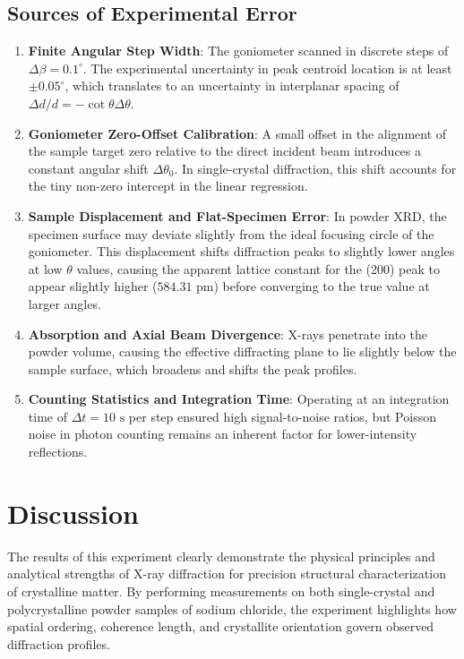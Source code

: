 \documentclass[12pt,a4paper]{article}
\begin{document}
\subsection{Sources of Experimental Error}
\begin{enumerate}
    \item \textbf{Finite Angular Step Width}: The goniometer scanned in discrete steps of $\Delta\beta = 0.1^\circ$. The experimental uncertainty in peak centroid location is at least $\pm 0.05^\circ$, which translates to an uncertainty in interplanar spacing of $\Delta d / d = -\cot\theta \Delta\theta$.
    \item \textbf{Goniometer Zero-Offset Calibration}: A small offset in the alignment of the sample target zero relative to the direct incident beam introduces a constant angular shift $\Delta\theta_0$. In single-crystal diffraction, this shift accounts for the tiny non-zero intercept in the linear regression.
    \item \textbf{Sample Displacement and Flat-Specimen Error}: In powder XRD, the specimen surface may deviate slightly from the ideal focusing circle of the goniometer. This displacement shifts diffraction peaks to slightly lower angles at low $\theta$ values, causing the apparent lattice constant for the (200) peak to appear slightly higher ($584.31\text{ pm}$) before converging to the true value at larger angles.
    \item \textbf{Absorption and Axial Beam Divergence}: X-rays penetrate into the powder volume, causing the effective diffracting plane to lie slightly below the sample surface, which broadens and shifts the peak profiles.
    \item \textbf{Counting Statistics and Integration Time}: Operating at an integration time of $\Delta t = 10\text{ s}$ per step ensured high signal-to-noise ratios, but Poisson noise in photon counting remains an inherent factor for lower-intensity reflections.
\end{enumerate}

\newpage

\section{Discussion}
The results of this experiment clearly demonstrate the physical principles and analytical strengths of X-ray diffraction for precision structural characterization of crystalline matter. By performing measurements on both single-crystal and polycrystalline powder samples of sodium chloride, the experiment highlights how spatial ordering, coherence length, and crystallite orientation govern observed diffraction profiles.
\end{document}
